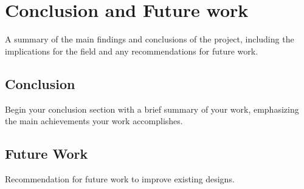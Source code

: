 \clearpage
\section{Conclusion and Future work}

A summary of the main findings and conclusions of the project, including the implications for the field and any recommendations for future work.

\subsection{Conclusion}

Begin your conclusion section with a brief summary of your work, emphasizing the main achievements your work accomplishes. 

\subsection{Future Work}

Recommendation for future work to improve existing designs.
